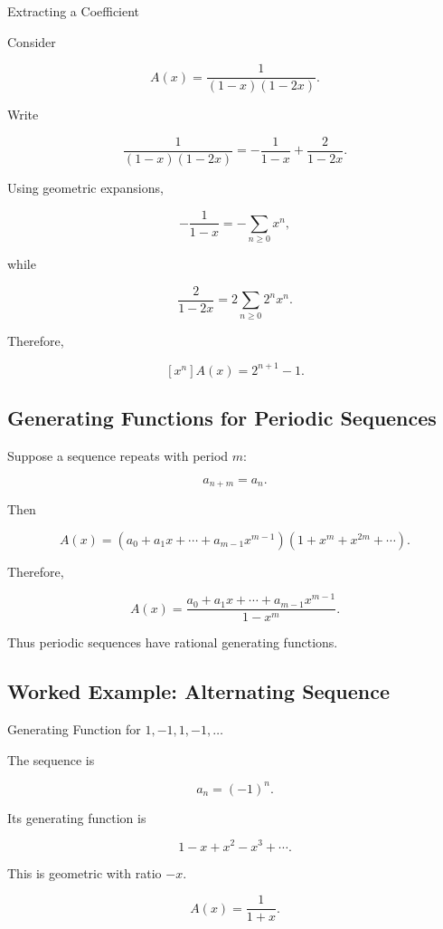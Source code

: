 \begin{workedexamplebox}{Extracting a Coefficient}

Consider

\[
A(x)
=
\frac{1}{(1-x)(1-2x)}.
\]

Write

\[
\frac{1}{(1-x)(1-2x)}
=
-\frac{1}{1-x}
+
\frac{2}{1-2x}.
\]

Using geometric expansions,

\[
-\frac{1}{1-x}
=
-\sum_{n\geq0}x^n,
\]

while

\[
\frac{2}{1-2x}
=
2\sum_{n\geq0}2^nx^n.
\]

Therefore,

\begin{answerbox}
\[
\boxed{
[x^n]A(x)
=
2^{n+1}-1.
}
\]
\end{answerbox}

\end{workedexamplebox}

\subsection{Generating Functions for Periodic Sequences}
\label{subsec:gf-periodic-sequences}

Suppose a sequence repeats with period \(m\):

\[
a_{n+m}=a_n.
\]

Then

\[
A(x)
=
(a_0+a_1x+\cdots+a_{m-1}x^{m-1})
(1+x^m+x^{2m}+\cdots).
\]

Therefore,

\[
\boxed{
A(x)
=
\frac{
a_0+a_1x+\cdots+a_{m-1}x^{m-1}
}{
1-x^m
}.
}
\]

Thus periodic sequences have rational generating functions.

\subsection{Worked Example: Alternating Sequence}
\label{subsec:worked-alternating-gf}

\begin{workedexamplebox}{Generating Function for \(1,-1,1,-1,\ldots\)}

The sequence is

\[
a_n=(-1)^n.
\]

Its generating function is

\[
1-x+x^2-x^3+\cdots.
\]

This is geometric with ratio \(-x\).

\begin{answerbox}
\[
\boxed{
A(x)=\frac{1}{1+x}.
}
\]
\end{answerbox}

\end{workedexamplebox}

